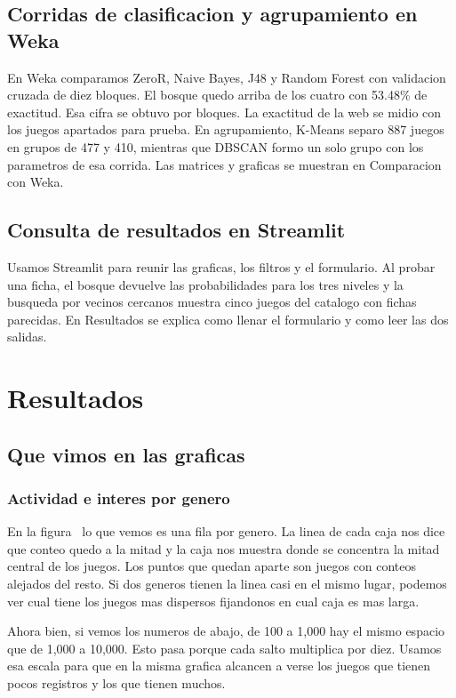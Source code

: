 \documentclass[letterpaper,11pt]{article}
\begin{document}
\subsection{Corridas de clasificacion y agrupamiento en Weka}
En Weka comparamos ZeroR, Naive Bayes, J48 y Random Forest con validacion cruzada de diez bloques. El bosque quedo arriba de los cuatro con 53.48\% de exactitud. Esa cifra se obtuvo por bloques. La exactitud de la web se midio con los juegos apartados para prueba. En agrupamiento, K-Means separo 887 juegos en grupos de 477 y 410, mientras que DBSCAN formo un solo grupo con los parametros de esa corrida. Las matrices y graficas se muestran en Comparacion con Weka.

\subsection{Consulta de resultados en Streamlit}
Usamos Streamlit para reunir las graficas, los filtros y el formulario. Al probar una ficha, el bosque devuelve las probabilidades para los tres niveles y la busqueda por vecinos cercanos muestra cinco juegos del catalogo con fichas parecidas. En Resultados se explica como llenar el formulario y como leer las dos salidas.

\section{Resultados}
\subsection{Que vimos en las graficas}
\subsubsection{Actividad e interes por genero}
En la figura~ lo que vemos es una fila por genero. La linea de cada caja nos dice que conteo quedo a la mitad y la caja nos muestra donde se concentra la mitad central de los juegos. Los puntos que quedan aparte son juegos con conteos alejados del resto. Si dos generos tienen la linea casi en el mismo lugar, podemos ver cual tiene los juegos mas dispersos fijandonos en cual caja es mas larga.

Ahora bien, si vemos los numeros de abajo, de 100 a 1,000 hay el mismo espacio que de 1,000 a 10,000. Esto pasa porque cada salto multiplica por diez. Usamos esa escala para que en la misma grafica alcancen a verse los juegos que tienen pocos registros y los que tienen muchos.
\end{document}
